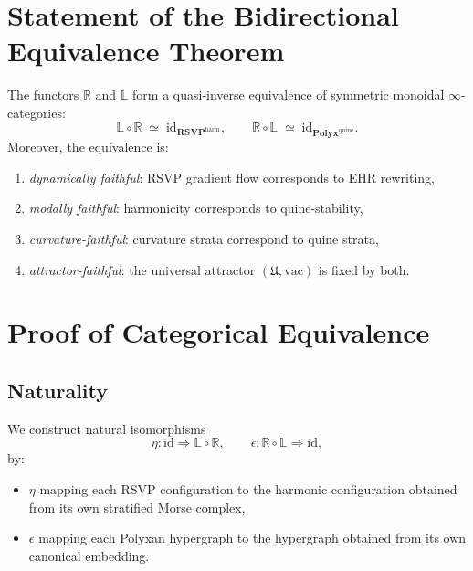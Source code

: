 \section{Statement of the Bidirectional Equivalence Theorem}

\begin{theorem}
\label{thm:bidirectional-equivalence}
The functors $\mathbb{R}$ and $\mathbb{L}$ form a quasi-inverse equivalence of
symmetric monoidal $\infty$-categories:
\[
\mathbb{L} \circ \mathbb{R} \;\simeq\; \mathrm{id}_{\mathbf{RSVP}^{\mathrm{harm}}},
\qquad
\mathbb{R} \circ \mathbb{L} \;\simeq\; \mathrm{id}_{\mathbf{Polyx}^{\mathrm{quine}}}.
\]
Moreover, the equivalence is:
\begin{enumerate}
\item \emph{dynamically faithful}:
  RSVP gradient flow corresponds to EHR rewriting,
\item \emph{modally faithful}:
  harmonicity corresponds to quine-stability,
\item \emph{curvature-faithful}:
  curvature strata correspond to quine strata,
\item \emph{attractor-faithful}:
  the universal attractor $(\mathfrak{U},\mathrm{vac})$ is fixed by both.
\end{enumerate}
\end{theorem}



\section{Proof of Categorical Equivalence}

\subsection{Naturality}

We construct natural isomorphisms
\[
\eta : \mathrm{id} \Rightarrow \mathbb{L}\circ\mathbb{R},
\qquad
\epsilon : \mathbb{R}\circ\mathbb{L} \Rightarrow \mathrm{id},
\]
by:

\begin{itemize}
\item $\eta$ mapping each RSVP configuration to the harmonic configuration
  obtained from its own stratified Morse complex,
\item $\epsilon$ mapping each Polyxan hypergraph to the hypergraph obtained
  from its own canonical embedding.
\end{itemize}

